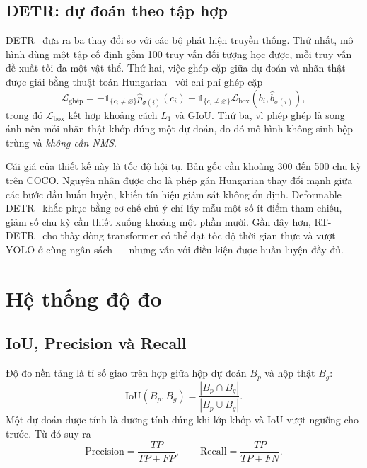\subsection{DETR: dự đoán theo tập hợp}

DETR~\cite{carion2020detr} đưa ra ba thay đổi so với các bộ phát hiện truyền thống. Thứ nhất, mô
hình dùng một tập cố định gồm 100 truy vấn đối tượng học được, mỗi truy vấn đề xuất tối đa một vật
thể. Thứ hai, việc ghép cặp giữa dự đoán và nhãn thật được giải bằng thuật toán
Hungarian~\cite{kuhn1955hungarian} với chi phí ghép cặp
\begin{equation}
\label{eq:hungarian}
\mathcal{L}_{\text{ghép}} = -\mathbb{1}_{\{c_i \neq \varnothing\}} \hat{p}_{\sigma(i)}(c_i)
  + \mathbb{1}_{\{c_i \neq \varnothing\}} \mathcal{L}_{\text{box}}(b_i, \hat{b}_{\sigma(i)}),
\end{equation}
trong đó $\mathcal{L}_{\text{box}}$ kết hợp khoảng cách $L_1$ và GIoU. Thứ ba, vì phép ghép là
song ánh nên mỗi nhãn thật khớp đúng một dự đoán, do đó mô hình không sinh hộp trùng và
\emph{không cần NMS}.

Cái giá của thiết kế này là tốc độ hội tụ. Bản gốc cần khoảng 300 đến 500 chu kỳ trên COCO. Nguyên
nhân được cho là phép gán Hungarian thay đổi mạnh giữa các bước đầu huấn luyện, khiến tín hiệu
giám sát không ổn định. Deformable DETR~\cite{zhu2021deformabledetr} khắc phục bằng cơ chế chú ý
chỉ lấy mẫu một số ít điểm tham chiếu, giảm số chu kỳ cần thiết xuống khoảng một phần mười. Gần
đây hơn, RT-DETR~\cite{zhao2024rtdetr} cho thấy dòng transformer có thể đạt tốc độ thời gian thực
và vượt YOLO ở cùng ngân sách --- nhưng vẫn với điều kiện được huấn luyện đầy đủ.

\section{Hệ thống độ đo}

\subsection{IoU, Precision và Recall}

Độ đo nền tảng là tỉ số giao trên hợp giữa hộp dự đoán $B_p$ và hộp thật $B_g$:
\begin{equation}
\label{eq:iou}
\text{IoU}(B_p, B_g) = \frac{|B_p \cap B_g|}{|B_p \cup B_g|} .
\end{equation}
Một dự đoán được tính là dương tính đúng khi lớp khớp và IoU vượt ngưỡng cho trước. Từ đó suy ra
\begin{equation}
\label{eq:pr}
\text{Precision} = \frac{TP}{TP + FP}, \qquad
\text{Recall} = \frac{TP}{TP + FN}.
\end{equation}

